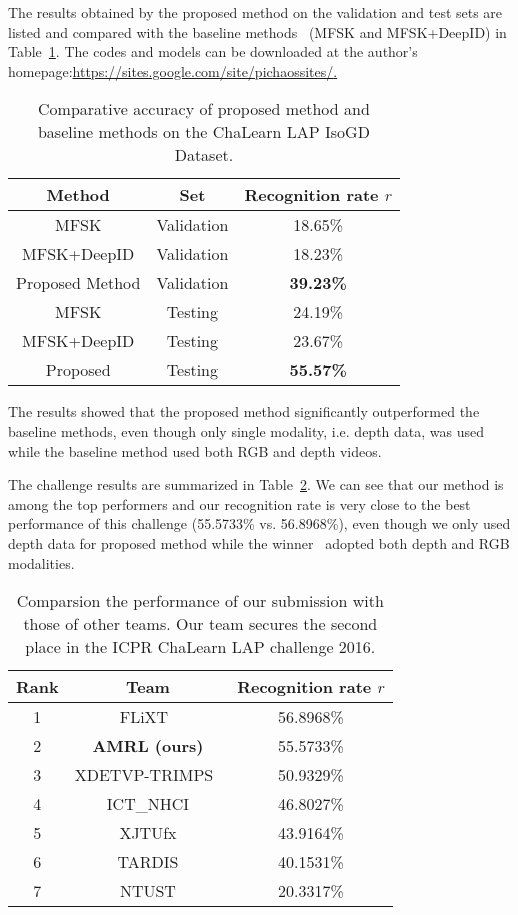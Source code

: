 \documentclass[10pt, a4paper, conference]{IEEEtran}
\begin{document}
The results obtained by the proposed method on the validation and test sets are listed and compared with the baseline methods~\cite{pami16Jun} (MFSK and MFSK+DeepID) in Table~\ref{table2}. The codes and models can be downloaded at the author's homepage:\url{https://sites.google.com/site/pichaossites/}\href{https://sites.google.com/site/pichaossites/}.

\begin{table}[!ht]
\centering
\caption{Comparative accuracy of proposed method and baseline
methods on the ChaLearn LAP IsoGD Dataset. \label{table2}}
\begin{tabular}{|c|c|c|}
\hline
Method & Set & Recognition rate $r$\\
\hline
MFSK & Validation & 18.65\%\\
\hline
MFSK+DeepID & Validation & 18.23\%\\
\hline
Proposed Method & Validation & \textbf{39.23\%}\\
\hline
MFSK & Testing & 24.19\% \\
\hline
MFSK+DeepID & Testing & 23.67\%\\
\hline
Proposed & Testing &\textbf{55.57\%}\\
\hline
\end{tabular}
\end{table}


The results showed that the proposed method
significantly outperformed the baseline methods, even though only single
modality, i.e. depth data, was used while the baseline method used both RGB and
depth videos.

The challenge results are summarized in Table~\ref{table3}. We can see that our method is among the top performers and our recognition rate is very close to the best performance of this challenge (55.5733\% vs. 56.8968\%), even though we only used depth data for proposed method while the winner~\cite{yunanli} adopted both depth and RGB modalities.

\begin{table}[!ht]
\centering
\caption{Comparsion the performance of our submission with those of other teams. Our team secures the second place in the ICPR ChaLearn LAP challenge 2016. \label{table3}}
\begin{tabular}{|c|c|c|}
\hline
Rank & Team & Recognition rate $r$\\
\hline
1 & FLiXT~\cite{yunanli} & 56.8968\%\\
\hline
2 & \textbf{AMRL (ours)} & 55.5733\%\\
\hline
3 & XDETVP-TRIMPS~\cite{guangming} & 50.9329\%\\
\hline
4 & ICT\_NHCI & 46.8027\%\\
\hline
5 & XJTUfx & 43.9164\%\\
\hline
6 & TARDIS & 40.1531\%\\
\hline
7 & NTUST & 20.3317\%\\
\hline
\end{tabular}
\end{table}
\end{document}
